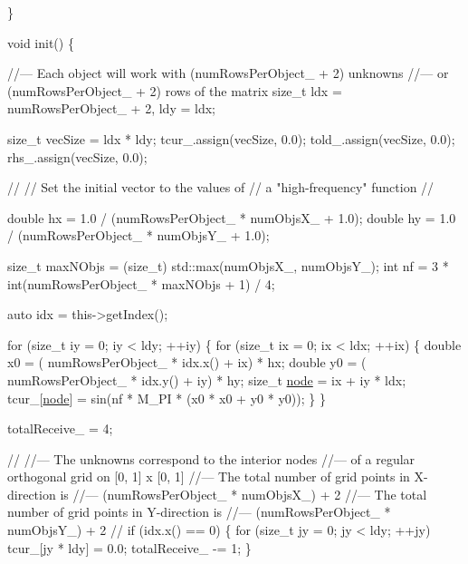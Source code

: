\begin{DoxyCodeInclude}
  \}


  \textcolor{keywordtype}{void} init() \{

    \textcolor{comment}{//--- Each object will work with (numRowsPerObject\_ + 2) unknowns}
    \textcolor{comment}{//--- or (numRowsPerObject\_ + 2) rows of the matrix}
    \textcolor{keywordtype}{size\_t} ldx = numRowsPerObject\_ + 2, ldy = ldx;

    \textcolor{keywordtype}{size\_t} vecSize = ldx * ldy;
    tcur\_.assign(vecSize, 0.0);
    told\_.assign(vecSize, 0.0);
    rhs\_.assign(vecSize, 0.0);

    \textcolor{comment}{//}
    \textcolor{comment}{// Set the initial vector to the values of}
    \textcolor{comment}{// a "high-frequency" function}
    \textcolor{comment}{//}

    \textcolor{keywordtype}{double} hx = 1.0 / (numRowsPerObject\_ * numObjsX\_ + 1.0);
    \textcolor{keywordtype}{double} hy = 1.0 / (numRowsPerObject\_ * numObjsY\_ + 1.0);

    \textcolor{keywordtype}{size\_t} maxNObjs = (size\_t) std::max(numObjsX\_, numObjsY\_);
    \textcolor{keywordtype}{int} nf = 3 * int(numRowsPerObject\_ * maxNObjs + 1) / 4;

    \textcolor{keyword}{auto} idx = this->getIndex();

    \textcolor{keywordflow}{for} (\textcolor{keywordtype}{size\_t} iy = 0; iy < ldy; ++iy) \{
      \textcolor{keywordflow}{for} (\textcolor{keywordtype}{size\_t} ix = 0; ix < ldx; ++ix) \{
        \textcolor{keywordtype}{double} x0 = ( numRowsPerObject\_ * idx.x() + ix) * hx;
        \textcolor{keywordtype}{double} y0 = ( numRowsPerObject\_ * idx.y() + iy) * hy;
        \textcolor{keywordtype}{size\_t} \hyperlink{namespacevt_1_1config_a46e57c33bee1b9f1fa95455af86d80e0a576033c81e2ddd03d721ecef3b1b3f81}{node} = ix + iy * ldx;
        tcur\_[\hyperlink{namespacevt_1_1config_a46e57c33bee1b9f1fa95455af86d80e0a576033c81e2ddd03d721ecef3b1b3f81}{node}] = sin(nf * M\_PI * (x0 * x0 + y0 * y0));
      \}
    \}

    totalReceive\_ = 4;

    \textcolor{comment}{//}
    \textcolor{comment}{//--- The unknowns correspond to the interior nodes}
    \textcolor{comment}{//--- of a regular orthogonal grid on [0, 1] x [0, 1]}
    \textcolor{comment}{//--- The total number of grid points in X-direction is}
    \textcolor{comment}{//--- (numRowsPerObject\_ * numObjsX\_) + 2}
    \textcolor{comment}{//--- The total number of grid points in Y-direction is}
    \textcolor{comment}{//--- (numRowsPerObject\_ * numObjsY\_) + 2}
    \textcolor{comment}{//}
    \textcolor{keywordflow}{if} (idx.x() == 0) \{
      \textcolor{keywordflow}{for} (\textcolor{keywordtype}{size\_t} jy = 0; jy < ldy; ++jy)
        tcur\_[jy * ldy] = 0.0;
      totalReceive\_ -= 1;
    \}


\end{DoxyCodeInclude}

